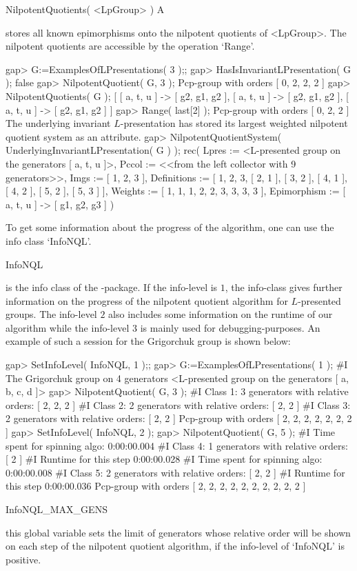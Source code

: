 \> NilpotentQuotients( <LpGroup> ) A

stores all known epimorphisms onto the nilpotent quotients of <LpGroup>.
The nilpotent quotients are accessible by the operation `Range'.

\beginexample
gap> G:=ExamplesOfLPresentations( 3 );;
gap> HasIsInvariantLPresentation( G );
false
gap> NilpotentQuotient( G, 3 );
Pcp-group with orders [ 0, 2, 2, 2 ]
gap> NilpotentQuotients( G );
[ [ a, t, u ] -> [ g2, g1, g2 ], [ a, t, u ] -> [ g2, g1, g2 ],
  [ a, t, u ] -> [ g2, g1, g2 ] ]
gap> Range( last[2] );
Pcp-group with orders [ 0, 2, 2 ]
\endexample
The underlying invariant $L$-presentation has stored its largest
weighted nilpotent quotient system as an attribute.
\beginexample
gap> NilpotentQuotientSystem( UnderlyingInvariantLPresentation( G ) );
rec( Lpres := <L-presented group on the generators [ a, t, u ]>,
  Pccol := <<from the left collector with 9 generators>>, Imgs := [ 1, 2, 3 ],
  Definitions := [ 1, 2, 3, [ 2, 1 ], [ 3, 2 ], [ 4, 1 ], [ 4, 2 ], [ 5, 2 ],
      [ 5, 3 ] ], Weights := [ 1, 1, 1, 2, 2, 3, 3, 3, 3 ],
  Epimorphism := [ a, t, u ] -> [ g1, g2, g3 ] )
\endexample


To get some information about the progress of the algorithm,
one can use the info class `InfoNQL'. 

\> InfoNQL

is the info class of the {\NQL}-package. If the info-level is $1$, the
info-class gives further information on the progress of the nilpotent
quotient algorithm for $L$-presented groups. The info-level $2$ also
includes some information on the runtime of our algorithm while the
info-level $3$ is mainly used for debugging-purposes. An example of such
a session for the Grigorchuk group is shown below:

\beginexample
gap> SetInfoLevel( InfoNQL, 1 );;
gap> G:=ExamplesOfLPresentations( 1 );
#I  The Grigorchuk group on 4 generators
<L-presented group on the generators [ a, b, c, d ]>
gap> NilpotentQuotient( G, 3 );
#I  Class 1: 3 generators with relative orders: [ 2, 2, 2 ]
#I  Class 2: 2 generators with relative orders: [ 2, 2 ]
#I  Class 3: 2 generators with relative orders: [ 2, 2 ]
Pcp-group with orders [ 2, 2, 2, 2, 2, 2, 2 ]
gap> SetInfoLevel( InfoNQL, 2 );
gap> NilpotentQuotient( G, 5 );
#I  Time spent for spinning algo:  0:00:00.004
#I  Class 4: 1 generators with relative orders: [ 2 ]
#I  Runtime for this step  0:00:00.028
#I  Time spent for spinning algo:  0:00:00.008
#I  Class 5: 2 generators with relative orders: [ 2, 2 ]
#I  Runtime for this step  0:00:00.036
Pcp-group with orders [ 2, 2, 2, 2, 2, 2, 2, 2, 2, 2 ]
\endexample

\> InfoNQL_MAX_GENS 

this global variable sets the limit of generators whose relative order
will be shown on each step of the nilpotent quotient algorithm, if the
info-level of `InfoNQL' is positive.

